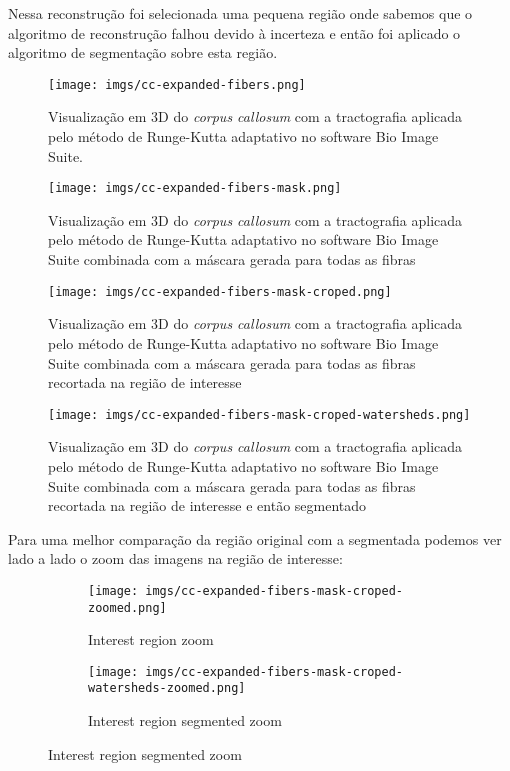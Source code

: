 \documentclass[a4paper,11pt]{report}
\begin{document}
    Nessa reconstrução foi selecionada uma pequena região onde sabemos que o algoritmo de reconstrução falhou devido à incerteza e então foi aplicado o algoritmo de segmentação sobre esta região.

    \begin{figure}[H]
      \texttt{[image: imgs/cc-expanded-fibers.png]}
      \caption{Visualização em 3D do \textit{corpus callosum} com a tractografia aplicada pelo método de Runge-Kutta adaptativo no software Bio Image Suite.}
      \label{fig:fibres}
    \end{figure}

    \begin{figure}[H]
      \texttt{[image: imgs/cc-expanded-fibers-mask.png]}
      \caption{Visualização em 3D do \textit{corpus callosum} com a tractografia aplicada pelo método de Runge-Kutta adaptativo no software Bio Image Suite combinada com a máscara gerada para todas as fibras}
      \label{fig:fibres-mask}
    \end{figure}

    \begin{figure}[H]
      \texttt{[image: imgs/cc-expanded-fibers-mask-croped.png]}
      \caption{Visualização em 3D do \textit{corpus callosum} com a tractografia aplicada pelo método de Runge-Kutta adaptativo no software Bio Image Suite combinada com a máscara gerada para todas as fibras recortada na região de interesse}
      \label{fig:fibres-mask-croped}
    \end{figure}

    \begin{figure}[H]
      \texttt{[image: imgs/cc-expanded-fibers-mask-croped-watersheds.png]}
      \caption{Visualização em 3D do \textit{corpus callosum} com a tractografia aplicada pelo método de Runge-Kutta adaptativo no software Bio Image Suite combinada com a máscara gerada para todas as fibras recortada na região de interesse e então segmentado}
      \label{fig:fibres-mask-croped-segmented}
    \end{figure}

    Para uma melhor comparação da região original com a segmentada podemos ver lado a lado o zoom das imagens na região de interesse:

    \begin{figure}[H]
      \centering
      \begin{subfigure}[t]{.49\textwidth}
        \texttt{[image: imgs/cc-expanded-fibers-mask-croped-zoomed.png]}
        \caption{Interest region zoom}
        \label{subfig:fibres-mask-croped-zoomed}
      \end{subfigure}\hfill%
      \begin{subfigure}[t]{.49\textwidth}
        \texttt{[image: imgs/cc-expanded-fibers-mask-croped-watersheds-zoomed.png]}
        \caption{Interest region segmented zoom}
        \label{subfig:fibres-mask-croped-segmented-zoomed}
      \end{subfigure}\hfill
    \end{figure}
\end{document}
